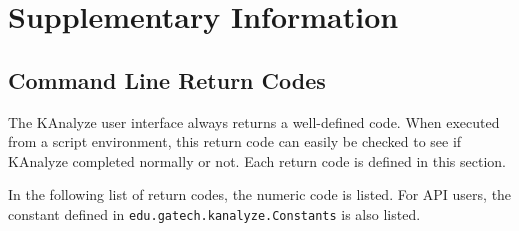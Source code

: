
\section{Supplementary Information}
\label{sec.suppl}


\subsection{Command Line Return Codes}
\label{sec.supl.retcode}

The KAnalyze user interface always returns a well-defined code. When executed from a script environment, this return code can easily be checked to see if KAnalyze completed normally or not. Each return code is defined in this section.

In the following list of return codes, the numeric code is listed. For API users, the constant defined in \texttt{edu.gatech.kanalyze.Constants} is also
listed.

